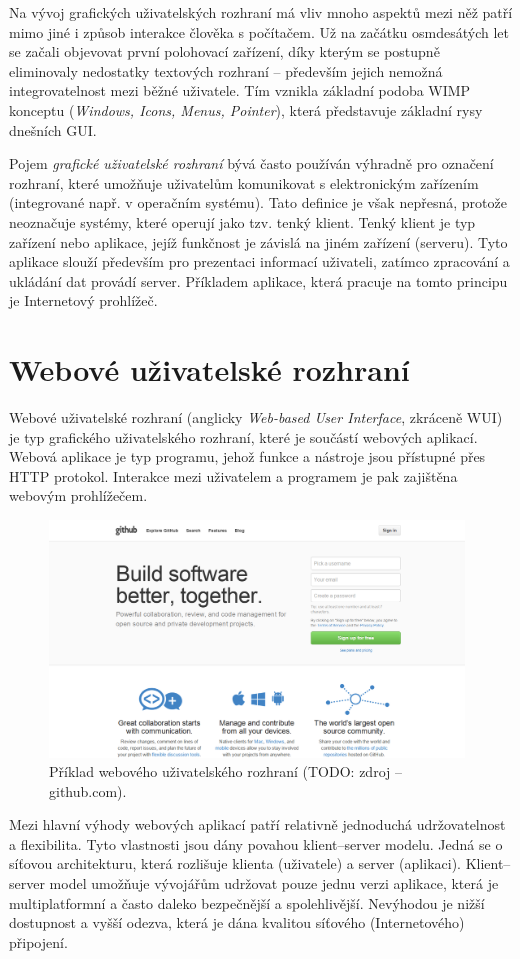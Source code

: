 Na vývoj grafických uživatelských rozhraní má vliv mnoho aspektů mezi něž patří mimo jiné i způsob interakce člověka s počítačem. Už na začátku osmdesátých let se začali objevovat první polohovací zařízení, díky kterým se postupně eliminovaly nedostatky textových rozhraní -- především jejich nemožná integrovatelnost mezi běžné uživatele. Tím vznikla základní podoba WIMP konceptu (\textit{Windows, Icons, Menus, Pointer}), která představuje základní rysy dnešních GUI.

Pojem \textit{grafické uživatelské rozhraní} bývá často používán výhradně pro označení rozhraní, které umožňuje uživatelům komunikovat s elektronickým zařízením (integrované např. v operačním systému). Tato definice je však nepřesná, protože neoznačuje systémy, které operují jako tzv. tenký klient. Tenký klient je typ zařízení nebo aplikace, jejíž funkčnost je závislá na jiném zařízení (serveru). Tyto aplikace slouží především pro prezentaci informací uživateli, zatímco zpracování a ukládání dat provádí server. Příkladem aplikace, která pracuje na tomto principu je Internetový prohlížeč.

\section{Webové uživatelské rozhraní}
\label{sec:wui}

Webové uživatelské rozhraní (anglicky \textit{Web-based User Interface}, zkráceně WUI) je typ grafického uživatelského rozhraní, které je součástí webových aplikací. Webová aplikace je typ programu, jehož funkce a nástroje jsou přístupné přes HTTP protokol. Interakce mezi uživatelem a programem je pak zajištěna webovým prohlížečem.

\begin{figure}[htbp]
    \centering
    \includegraphics[width=11cm]{images/wui-example.png}
    \caption{Příklad webového uživatelského rozhraní (TODO: zdroj -- github.com).}
\end{figure}

Mezi hlavní výhody webových aplikací patří relativně jednoduchá udržovatelnost a flexibilita. Tyto vlastnosti jsou dány povahou klient--server modelu. Jedná se o síťovou architekturu, která rozlišuje klienta (uživatele) a server (aplikaci). Klient--server model umožňuje vývojářům udržovat pouze jednu verzi aplikace, která je multiplatformní a často daleko bezpečnější a spolehlivější. Nevýhodou je nižší dostupnost a vyšší odezva, která je dána kvalitou síťového (Internetového) připojení.
